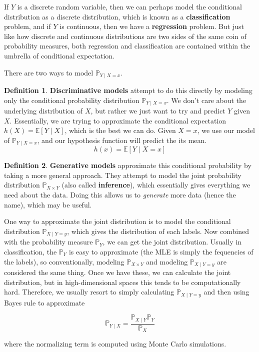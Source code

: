 \documentclass{article}
\theoremstyle{definition}
\newtheorem{definition}{Definition}[section]
\begin{document}
    If $Y$ is a discrete random variable, then we can perhaps model the conditional distribution as a discrete distribution, which is known as a \textbf{classification} problem, and if $Y$ is continuous, then we have a \textbf{regression} problem. But just like how discrete and continuous distributions are two sides of the same coin of probability measures, both regression and classification are contained within the umbrella of conditional expectation. 

    There are two ways to model $\mathbb{P}_{Y \mid X = x}$. 

    \begin{definition}
      \textbf{Discriminative models} attempt to do this directly by  modeling only the conditional probability distribution $\mathbb{P}_{Y \mid X = x}$. We don't care about the underlying distribution of $X$, but rather we just want to try and predict $Y$ given $X$. Essentially, we are trying to approximate the conditional expectation $h(X) = \mathbb{E}[Y \mid X]$, which is the best we can do. Given $X = x$, we use our model of $\mathbb{P}_{Y \mid X = x}$, and our hypothesis function will predict the its mean. 
        \[h(x) = \mathbb{E}[Y \mid X = x]\]
    \end{definition}

    \begin{definition}
      \textbf{Generative models} approximate this conditional probability by taking a more general approach. They attempt to model the joint probability distribution $\mathbb{P}_{X \times Y}$ (also called \textbf{inference}), which essentially gives everything we need about the data. Doing this allows us to \textit{generate} more data (hence the name), which may be useful. 
          
      One way to approximate the joint distribution is to model the conditional distribution $\mathbb{P}_{X \mid Y = y}$, which gives the distribution of each labels. Now combined with the probability measure $\mathbb{P}_Y$, we can get the joint distribution. Usually in classification, the $\mathbb{P}_Y$ is easy to approximate (the MLE is simply the fequencies of the labels), so conventionally, modeling $\mathbb{P}_{X \times Y}$ and modeling $\mathbb{P}_{X \mid Y = y}$ are considered the same thing. Once we have these, we can calculate the joint distribution, but in high-dimensional spaces this tends to be computationally hard. Therefore, we usually resort to simply calculating $\mathbb{P}_{X \mid Y = y}$ and then using Bayes rule to approximate 

        \[\mathbb{P}_{Y \mid X} = \frac{\mathbb{P}_{X \mid Y} \mathbb{P}_Y}{\mathbb{P}_X}\]

      where the normalizing term is computed using Monte Carlo simulations. 
    \end{definition}
\end{document}

